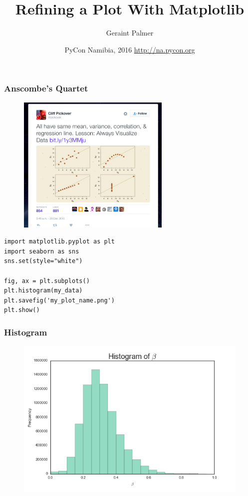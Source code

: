 \documentclass{beamer}
\title{Refining a Plot With Matplotlib}
\author{Geraint Palmer}
\date{PyCon Namibia, 2016 \newline \href{http://na.pycon.org}{\tiny{http://na.pycon.org}}}
\begin{document}
\frame{\titlepage}

\begin{frame}
\frametitle{Anscombe's Quartet}
\begin{figure}
	\includegraphics[width=0.65\textwidth]{anscombetweet}
\end{figure}
\end{frame}

\begin{frame}[fragile]
\begin{verbatim}
import matplotlib.pyplot as plt
import seaborn as sns
sns.set(style="white")

fig, ax = plt.subplots()
plt.histogram(my_data)
plt.savefig('my_plot_name.png')
plt.show()
\end{verbatim}
\end{frame}

\begin{frame}
\frametitle{Histogram}
\begin{figure}
	\includegraphics[width=\textwidth]{hist}
\end{figure}
\end{frame}
\end{document}
